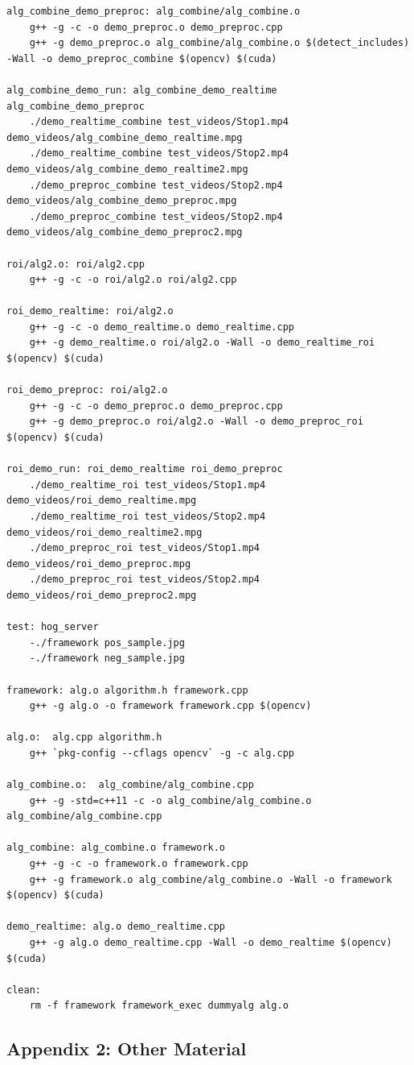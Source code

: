 \documentclass[letterpaper,10pt,titlepage]{article}
\begin{document}
\begin{lstlisting}
alg_combine_demo_preproc: alg_combine/alg_combine.o
	g++ -g -c -o demo_preproc.o demo_preproc.cpp
	g++ -g demo_preproc.o alg_combine/alg_combine.o $(detect_includes) -Wall -o demo_preproc_combine $(opencv) $(cuda)

alg_combine_demo_run: alg_combine_demo_realtime alg_combine_demo_preproc 
	./demo_realtime_combine test_videos/Stop1.mp4 demo_videos/alg_combine_demo_realtime.mpg 
	./demo_realtime_combine test_videos/Stop2.mp4 demo_videos/alg_combine_demo_realtime2.mpg 
	./demo_preproc_combine test_videos/Stop2.mp4 demo_videos/alg_combine_demo_preproc.mpg 
	./demo_preproc_combine test_videos/Stop2.mp4 demo_videos/alg_combine_demo_preproc2.mpg 

roi/alg2.o: roi/alg2.cpp
	g++ -g -c -o roi/alg2.o roi/alg2.cpp

roi_demo_realtime: roi/alg2.o
	g++ -g -c -o demo_realtime.o demo_realtime.cpp
	g++ -g demo_realtime.o roi/alg2.o -Wall -o demo_realtime_roi $(opencv) $(cuda)

roi_demo_preproc: roi/alg2.o
	g++ -g -c -o demo_preproc.o demo_preproc.cpp
	g++ -g demo_preproc.o roi/alg2.o -Wall -o demo_preproc_roi $(opencv) $(cuda)

roi_demo_run: roi_demo_realtime roi_demo_preproc 
	./demo_realtime_roi test_videos/Stop1.mp4 demo_videos/roi_demo_realtime.mpg 
	./demo_realtime_roi test_videos/Stop2.mp4 demo_videos/roi_demo_realtime2.mpg 
	./demo_preproc_roi test_videos/Stop1.mp4 demo_videos/roi_demo_preproc.mpg 
	./demo_preproc_roi test_videos/Stop2.mp4 demo_videos/roi_demo_preproc2.mpg 

test: hog_server
	-./framework pos_sample.jpg 
	-./framework neg_sample.jpg

framework: alg.o algorithm.h framework.cpp 
	g++ -g alg.o -o framework framework.cpp $(opencv)

alg.o:	alg.cpp algorithm.h
	g++ `pkg-config --cflags opencv` -g -c alg.cpp  

alg_combine.o:	alg_combine/alg_combine.cpp 
	g++ -g -std=c++11 -c -o alg_combine/alg_combine.o alg_combine/alg_combine.cpp

alg_combine: alg_combine.o framework.o
	g++ -g -c -o framework.o framework.cpp
	g++ -g framework.o alg_combine/alg_combine.o -Wall -o framework $(opencv) $(cuda)

demo_realtime: alg.o demo_realtime.cpp
	g++ -g alg.o demo_realtime.cpp -Wall -o demo_realtime $(opencv) $(cuda)

clean:
	rm -f framework framework_exec dummyalg alg.o

\end{lstlisting}
\newpage

\vspace*{\fill}
\begin{center}
\begin{minipage}{0.6\textwidth}
\section*{Appendix 2: Other Material}
\end{minipage}
\end{center}
\vfill

\newpage
\end{document}
